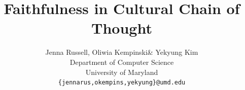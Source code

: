 \documentclass{article} %
\title{Faithfulness in Cultural Chain of Thought}
\author{Jenna Russell, Oliwia Kempinski\& Yekyung Kim \\
Department of Computer Science\\
University of Maryland\\
\texttt{\{jennarus,okempins,yekyung\}@umd.edu}
}
\begin{document}
\ifcolmsubmission
\linenumbers
\fi

\maketitle













\appendix

\end{document}
